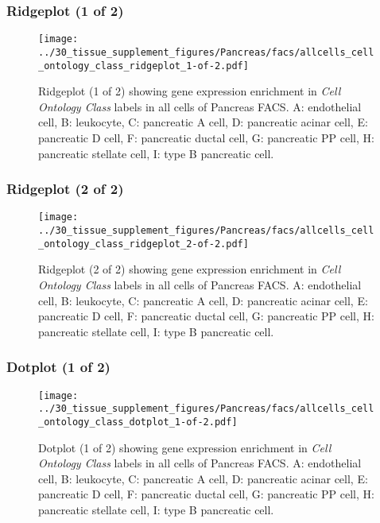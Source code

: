 \clearpage

\subsubsection{Ridgeplot (1 of 2)}
\begin{figure}[h]
\centering
\texttt{[image: ../30\_tissue\_supplement\_figures/Pancreas/facs/allcells\_cell\_ontology\_class\_ridgeplot\_1-of-2.pdf]}

\caption{ Ridgeplot (1 of 2)  showing gene expression enrichment in \emph{Cell Ontology Class} labels in all cells of Pancreas FACS. A: endothelial cell, B: leukocyte, C: pancreatic A cell, D: pancreatic acinar cell, E: pancreatic D cell, F: pancreatic ductal cell, G: pancreatic PP cell, H: pancreatic stellate cell, I: type B pancreatic cell.}
\end{figure}


\clearpage

\subsubsection{Ridgeplot (2 of 2)}
\begin{figure}[h]
\centering
\texttt{[image: ../30\_tissue\_supplement\_figures/Pancreas/facs/allcells\_cell\_ontology\_class\_ridgeplot\_2-of-2.pdf]}

\caption{ Ridgeplot (2 of 2)  showing gene expression enrichment in \emph{Cell Ontology Class} labels in all cells of Pancreas FACS. A: endothelial cell, B: leukocyte, C: pancreatic A cell, D: pancreatic acinar cell, E: pancreatic D cell, F: pancreatic ductal cell, G: pancreatic PP cell, H: pancreatic stellate cell, I: type B pancreatic cell.}
\end{figure}


\clearpage

\subsubsection{Dotplot (1 of 2)}
\begin{figure}[h]
\centering
\texttt{[image: ../30\_tissue\_supplement\_figures/Pancreas/facs/allcells\_cell\_ontology\_class\_dotplot\_1-of-2.pdf]}

\caption{ Dotplot (1 of 2)  showing gene expression enrichment in \emph{Cell Ontology Class} labels in all cells of Pancreas FACS. A: endothelial cell, B: leukocyte, C: pancreatic A cell, D: pancreatic acinar cell, E: pancreatic D cell, F: pancreatic ductal cell, G: pancreatic PP cell, H: pancreatic stellate cell, I: type B pancreatic cell.}
\end{figure}


